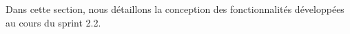 Dans cette section, nous détaillons la conception des fonctionnalités développées au cours du sprint 2.2.